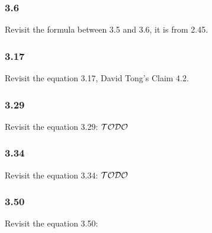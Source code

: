 
\subsubsection{3.6}

Revisit the formula between 3.5 and 3.6, it is from 2.45. 

\subsubsection{3.17}

Revisit the equation 3.17, David Tong's Claim 4.2.

\subsubsection{3.29}

Revisit the equation 3.29: $\mathcal{TODO}$

\subsubsection{3.34}

Revisit the equation 3.34: $\mathcal{TODO}$

\subsubsection{3.50}

Revisit the equation 3.50:

